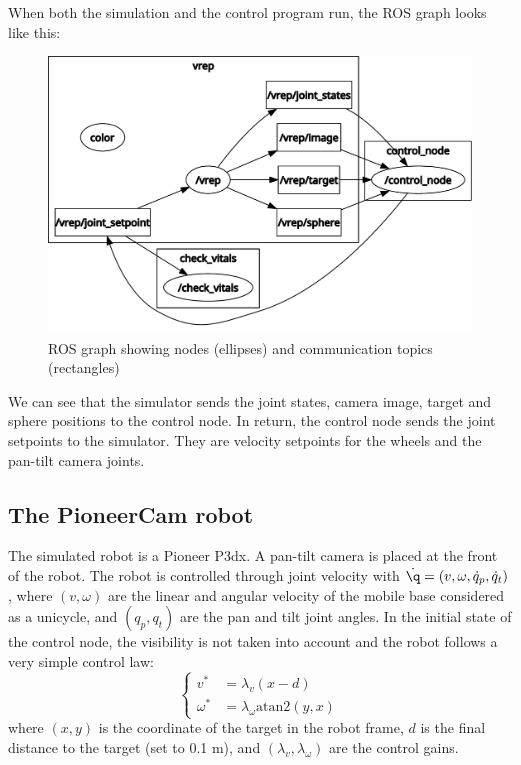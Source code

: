 \documentclass{ecnreport}
\begin{document}
When both the simulation and the control program run, the ROS graph looks like this:

\begin{figure}[h!]\centering
 \includegraphics[width=.6\linewidth]{rosgraph}
 \caption{ROS graph showing nodes (ellipses) and communication topics (rectangles)}
 \label{fig:rosgraph}
\end{figure}

We can see that the simulator sends the joint states, camera image, target and sphere positions to the control node. In return, the control node sends the joint setpoints
to the simulator. They are velocity setpoints for the wheels and the pan-tilt camera joints.\\


\subsection{The PioneerCam robot}

The simulated robot is a Pioneer P3dx. A pan-tilt camera is placed at the front of the robot. The robot is controlled through joint velocity with $\dot \q = (v, \omega, \dot q_p, \dot q_t)$, where $(v,\omega)$ are the linear and angular velocity
of the mobile base considered as a unicycle, and $(q_p, q_t)$ are the pan and tilt joint angles. In the initial state of the control node, the visibility is not taken into account and the robot follows a very simple control law:
\begin{equation}\label{raw}
 \left\{\begin{array}{ll}
         v^* &= \lambda_v(x-d) \\ \omega^* &= \lambda_{\omega}\text{atan2}(y, x)
        \end{array}\right.
\end{equation}where $(x,y)$ is the coordinate of the target in the robot frame, $d$ is the final distance to the target (set to 0.1 m), and $(\lambda_v, \lambda_{\omega})$ are the control gains.\\
\end{document}
